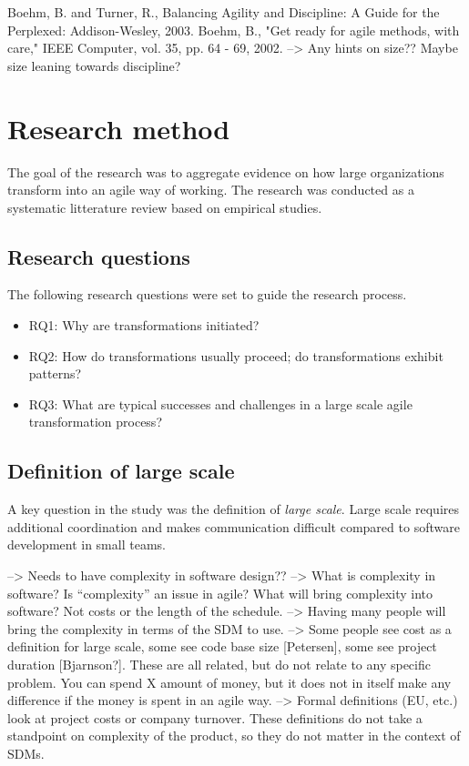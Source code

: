 \documentclass[preprint,authoryear,12pt]{elsarticle}
\begin{document}
Boehm, B. and Turner, R., Balancing Agility and Discipline: A Guide for the
Perplexed: Addison-Wesley, 2003.
Boehm, B., "Get ready for agile methods, with care," IEEE Computer, vol. 35,
pp. 64 - 69, 2002.
--> Any hints on size?? Maybe size leaning towards discipline?


\section{Research method}
\label{sec:method}

The goal of the research was to aggregate evidence on how large organizations
transform into an agile way of working. The research was conducted as a
systematic litterature review based on empirical studies.

\subsection{Research questions}

The following research questions were set to guide the research process.

\begin{itemize}

\item
RQ1: Why are transformations initiated?

\item
RQ2: How do transformations usually proceed; do transformations exhibit patterns?

\item
RQ3: What are typical successes and challenges in a large scale agile
    transformation process?

\end{itemize}


\subsection{Definition of large scale}
\label{sec:largescale}

A key question in the study was the definition of \emph{large scale}. Large
scale requires additional coordination and makes communication difficult
compared to software development in small teams.

--> Needs to have complexity in software design?? --> What is complexity in software?
    Is ``complexity'' an issue in agile?
    What will bring complexity into software? Not costs or the length of the
    schedule. --> Having many people will bring the complexity in terms of the
    SDM to use.
--> Some people see cost as a definition for large scale, some see code base
    size [Petersen], some see project duration [Bjarnson?]. These are all
    related, but do not relate to any specific problem. You can spend X amount
    of money, but it does not in itself make any difference if the money is
    spent in an agile way.
--> Formal definitions (EU, etc.) look at project costs or company turnover.
    These definitions do not take a standpoint on complexity of the product, so
    they do not matter in the context of SDMs.
\end{document}
